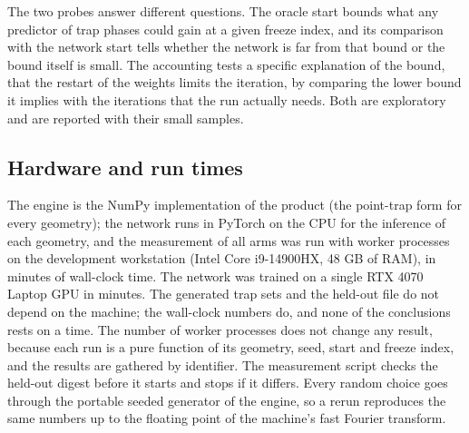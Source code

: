 The two probes answer different questions. The oracle start bounds what any predictor of trap phases could gain at a given freeze index, and its comparison with the network start tells whether the network is far from that bound or the bound itself is small. The accounting tests a specific explanation of the bound, that the restart of the weights limits the iteration, by comparing the lower bound it implies with the iterations that the run actually needs. Both are exploratory and are reported with their small samples.

\subsection{Hardware and run times}\label{sec:hardware}

The engine is the NumPy implementation of the product (the point-trap form for every geometry); the network runs in PyTorch on the CPU for the inference of each geometry, and the measurement of all arms was run with \nWorkers{} worker processes on the development workstation (Intel Core i9-14900HX, 48 GB of RAM), in \runtimeMin{} minutes of wall-clock time. The network was trained on a single RTX 4070 Laptop GPU in \trainMinutes{} minutes. The generated trap sets and the held-out file do not depend on the machine; the wall-clock numbers do, and none of the conclusions rests on a time. The number of worker processes does not change any result, because each run is a pure function of its geometry, seed, start and freeze index, and the results are gathered by identifier. The measurement script checks the held-out digest before it starts and stops if it differs. Every random choice goes through the portable seeded generator of the engine, so a rerun reproduces the same numbers up to the floating point of the machine's fast Fourier transform.
